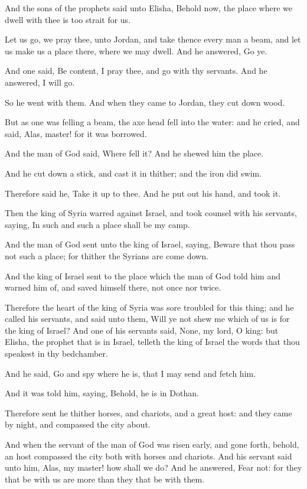 \Chapter
\Verse And the sons of the prophets said unto Elisha, Behold now, the place where we dwell with thee is too strait for us.

\Verse Let us go, we pray thee, unto Jordan, and take thence every man a beam, and let us make us a place there, where we may dwell. And he answered, Go ye.

\Verse And one said, Be content, I pray thee, and go with thy servants.  And he answered, I will go.

\Verse So he went with them. And when they came to Jordan, they cut down wood.

\Verse But as one was felling a beam, the axe head fell into the water: and he cried, and said, Alas, master! for it was borrowed.

\Verse And the man of God said, Where fell it? And he shewed him the place.

And he cut down a stick, and cast it in thither; and the iron did swim.

\Verse Therefore said he, Take it up to thee. And he put out his hand, and took it.

\Verse Then the king of Syria warred against Israel, and took counsel with his servants, saying, In such and such a place shall be my camp.

\Verse And the man of God sent unto the king of Israel, saying, Beware that thou pass not such a place; for thither the Syrians are come down.

\Verse And the king of Israel sent to the place which the man of God told him and warned him of, and saved himself there, not once nor twice.

\Verse Therefore the heart of the king of Syria was sore troubled for this thing; and he called his servants, and said unto them, Will ye not shew me which of us is for the king of Israel?  \Verse And one of his servants said, None, my lord, O king: but Elisha, the prophet that is in Israel, telleth the king of Israel the words that thou speakest in thy bedchamber.

\Verse And he said, Go and spy where he is, that I may send and fetch him.

And it was told him, saying, Behold, he is in Dothan.

\Verse Therefore sent he thither horses, and chariots, and a great host: and they came by night, and compassed the city about.

\Verse And when the servant of the man of God was risen early, and gone forth, behold, an host compassed the city both with horses and chariots. And his servant said unto him, Alas, my master! how shall we do?  \Verse And he answered, Fear not: for they that be with us are more than they that be with them.


